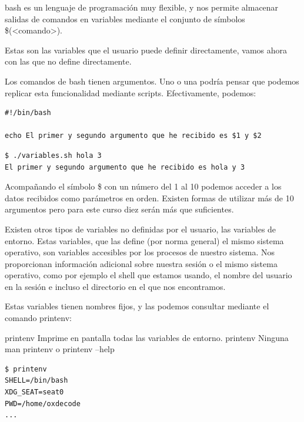 bash es un lenguaje de programación muy flexible, y nos permite almacenar salidas de comandos en variables mediante el conjunto de símbolos \$(<comando>).

Estas son las variables que el usuario puede definir directamente, vamos ahora con las que no define directamente.

Los comandos de bash tienen argumentos. Uno o una podría pensar que podemos replicar esta funcionalidad mediante scripts. Efectivamente, podemos:

\begin{tcolorbox-code}
\begin{lstlisting}
#!/bin/bash

echo El primer y segundo argumento que he recibido es $1 y $2 
\end{lstlisting}
\end{tcolorbox-code}

\begin{tcolorbox-code}
\begin{lstlisting}
$ ./variables.sh hola 3
El primer y segundo argumento que he recibido es hola y 3
\end{lstlisting}
\end{tcolorbox-code}

Acompañando el símbolo \$ con un número del 1 al 10 podemos acceder a los datos recibidos como parámetros en orden. Existen formas de utilizar más de 10 argumentos pero para este curso diez serán más que suficientes.

Existen otros tipos de variables no definidas por el usuario, las variables de entorno. Estas variables, que las define (por norma general) el mismo sistema operativo, son variables accesibles por los procesos de nuestro sistema. Nos proporcionan información adicional sobre nuestra sesión o el mismo sistema operativo, como por ejemplo el shell que estamos usando, el nombre del usuario en la sesión e incluso el directorio en el que nos encontramos.

Estas variables tienen nombres fijos, y las podemos consultar mediante el comando printenv:

\begin{command-info}
{printenv}
{Imprime en pantalla todas las variables de entorno.}
{printenv}
{Ninguna}
{man printenv o printenv --help}
\end{command-info}

\begin{tcolorbox-code}
\begin{lstlisting}
$ printenv
SHELL=/bin/bash
XDG_SEAT=seat0
PWD=/home/oxdecode
...
\end{lstlisting}
\end{tcolorbox-code}

